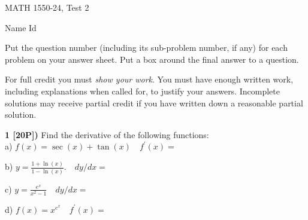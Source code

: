 \documentclass[12pt]{article}
\begin{document}
\begin{large}
\begin{bf}
\hspace{1.5in}
{MATH 1550-24, Test 2} %
\hspace{1in}
\parbox{1in}{ Name \newline Id}
\end{bf}
\end{large}

\vspace{0.2in}

Put the question number (including its sub-problem number, if any) for each 
problem on your answer sheet. 
Put a box around the final answer to a question.

\vspace*{.02in}
For full credit you must \emph{show your work}. You must have enough
written work, including explanations when called for, to justify your
answers. Incomplete solutions may receive partial credit if you have
written down a reasonable partial solution. %
                                         
\vspace*{.2in}

{\bf 1 [20P])}  Find the derivative of the following functions:
\\ 
a) $\displaystyle{f(x) = \sec (x)+\tan(x) \quad f^\prime(x) =}$

\vspace{.7in} 

b) $ \displaystyle{y = \frac{1  + \ln (x)}{1  - \ln (x)}. \quad dy/dx =}$ %

\vspace{.9in} 



c) $\displaystyle{y = \frac{e^x}{x^2-1}\quad dy/dx =}$

\vspace{.7in}

d) $\displaystyle{f(x) =  x^{e^x} \quad f^\prime(x) =}$

\vspace{.9in}
\end{document}
